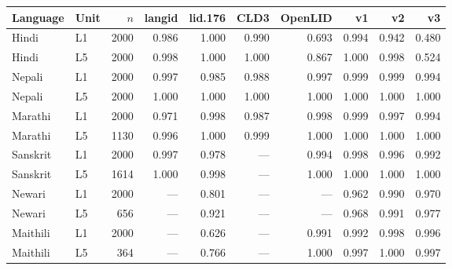 \begin{tabular}{llrrrrrrrr}
\toprule
Language & Unit & $n$ & langid & lid.176 & CLD3 & OpenLID & v1 & v2 & v3 \\
\midrule
Hindi & L1 & 2000 & 0.986 & 1.000 & 0.990 & 0.693 & 0.994 & 0.942 & 0.480 \\
Hindi & L5 & 2000 & 0.998 & 1.000 & 1.000 & 0.867 & 1.000 & 0.998 & 0.524 \\
Nepali & L1 & 2000 & 0.997 & 0.985 & 0.988 & 0.997 & 0.999 & 0.999 & 0.994 \\
Nepali & L5 & 2000 & 1.000 & 1.000 & 1.000 & 1.000 & 1.000 & 1.000 & 1.000 \\
Marathi & L1 & 2000 & 0.971 & 0.998 & 0.987 & 0.998 & 0.999 & 0.997 & 0.994 \\
Marathi & L5 & 1130 & 0.996 & 1.000 & 0.999 & 1.000 & 1.000 & 1.000 & 1.000 \\
Sanskrit & L1 & 2000 & 0.997 & 0.978 & --- & 0.994 & 0.998 & 0.996 & 0.992 \\
Sanskrit & L5 & 1614 & 1.000 & 0.998 & --- & 1.000 & 1.000 & 1.000 & 1.000 \\
Newari & L1 & 2000 & --- & 0.801 & --- & --- & 0.962 & 0.990 & 0.970 \\
Newari & L5 & 656 & --- & 0.921 & --- & --- & 0.968 & 0.991 & 0.977 \\
Maithili & L1 & 2000 & --- & 0.626 & --- & 0.991 & 0.992 & 0.998 & 0.996 \\
Maithili & L5 & 364 & --- & 0.766 & --- & 1.000 & 0.997 & 1.000 & 0.997 \\
\bottomrule
\end{tabular}
